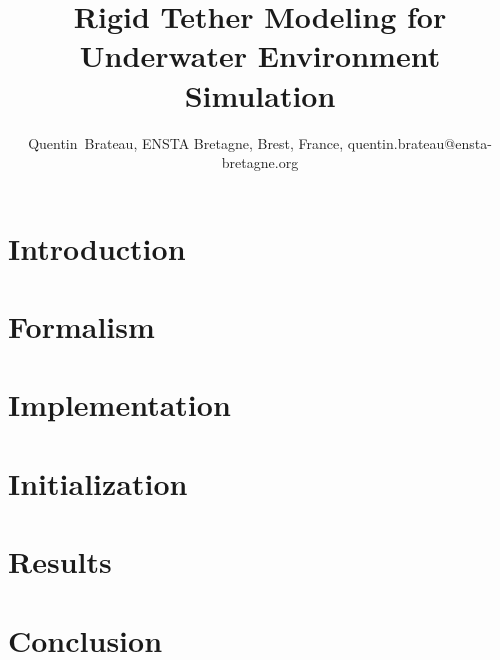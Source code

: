 \documentclass[10pt, journal, twoside]{IEEEtran}
\begin{document}
	\title{Rigid Tether Modeling for Underwater Environment Simulation}
	\author{Quentin~Brateau, ENSTA Bretagne, Brest, France, quentin.brateau@ensta-bretagne.org}


	\maketitle
	\IEEEdisplaynontitleabstractindextext

	\section{Introduction}
	\label{sec:introduction}
	

	\section{Formalism}
	\label{sec:formalism}
	

	\section{Implementation}
	\label{sec:implementation}
	

	\section{Initialization}
	\label{sec:initialization}
	

	\section{Results}
	\label{sec:results}
	

	\section{Conclusion}
	

	
	
\end{document}
